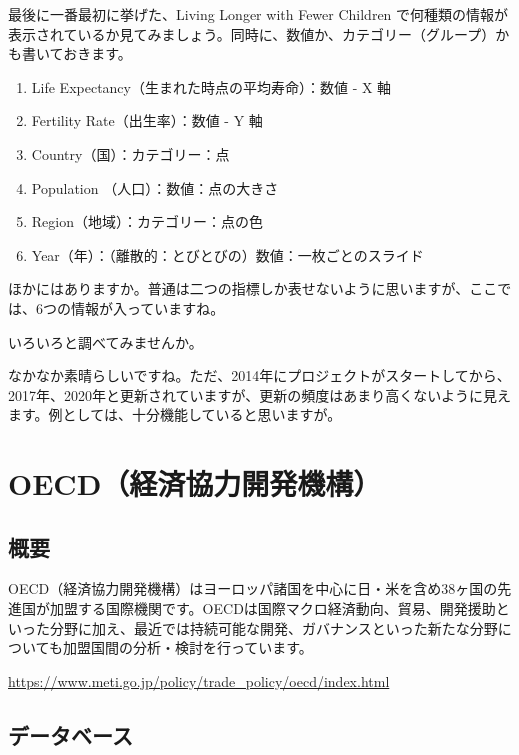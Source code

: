 \documentclass[
  xelatex, ja=standard]{bxjsbook}
\theoremstyle{definition}
\theoremstyle{definition}
\theoremstyle{definition}
\theoremstyle{definition}
\theoremstyle{remark}
\begin{document}
最後に一番最初に挙げた、Living Longer with Fewer Children で何種類の情報が表示されているか見てみましょう。同時に、数値か、カテゴリー（グループ）かも書いておきます。

\begin{enumerate}
\def\labelenumi{\arabic{enumi}.}
\item
  Life Expectancy（生まれた時点の平均寿命）：数値 - X 軸
\item
  Fertility Rate（出生率）：数値 - Y 軸
\item
  Country（国）：カテゴリー：点
\item
  Population （人口）：数値：点の大きさ
\item
  Region（地域）：カテゴリー：点の色
\item
  Year（年）：（離散的：とびとびの）数値：一枚ごとのスライド
\end{enumerate}

ほかにはありますか。普通は二つの指標しか表せないように思いますが、ここでは、6つの情報が入っていますね。

いろいろと調べてみませんか。

なかなか素晴らしいですね。ただ、2014年にプロジェクトがスタートしてから、2017年、2020年と更新されていますが、更新の頻度はあまり高くないように見えます。例としては、十分機能していると思いますが。

\hypertarget{oecd-site}{%
\chapter{OECD（経済協力開発機構）}\label{oecd-site}}

\hypertarget{ux6982ux8981-3}{%
\section{概要}\label{ux6982ux8981-3}}

OECD（経済協力開発機構）はヨーロッパ諸国を中心に日・米を含め38ヶ国の先進国が加盟する国際機関です。OECDは国際マクロ経済動向、貿易、開発援助といった分野に加え、最近では持続可能な開発、ガバナンスといった新たな分野についても加盟国間の分析・検討を行っています。

\url{https://www.meti.go.jp/policy/trade_policy/oecd/index.html}

\hypertarget{ux30c7ux30fcux30bfux30d9ux30fcux30b9-1}{%
\section{データベース}\label{ux30c7ux30fcux30bfux30d9ux30fcux30b9-1}}
\end{document}
